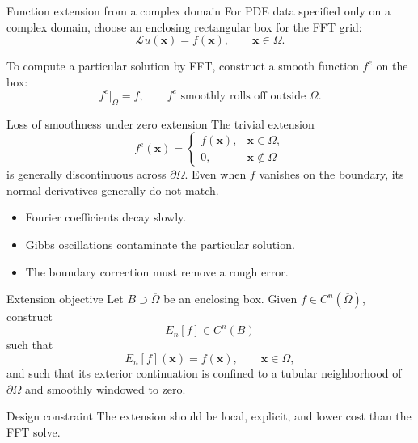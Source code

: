 \documentclass[aspectratio=169,11pt]{beamer}
\newcommand{\x}{\bm{x}}
\begin{document}
\begin{frame}{Function extension from a complex domain}
\small
For PDE data specified only on a complex domain, choose an enclosing
rectangular box for the FFT grid:
\[
  \mathcal{L}u(\x)=f(\x),\qquad \x\in\Omega.
\]

\vspace{2mm}
To compute a particular solution by FFT, construct a smooth function $f^e$ on
the box:
\[
  f^e|_\Omega=f,
  \qquad
  f^e\text{ smoothly rolls off outside }\Omega.
\]
\end{frame}

\begin{frame}{Loss of smoothness under zero extension}
\small
The trivial extension
\[
  f^e(\x)=
  \begin{cases}
  f(\x),& \x\in\Omega,\\
  0,& \x\notin\Omega
  \end{cases}
\]
is generally discontinuous across $\partial\Omega$. Even when $f$ vanishes on
the boundary, its normal derivatives generally do not match.

\begin{itemize}
  \item Fourier coefficients decay slowly.
  \item Gibbs oscillations contaminate the particular solution.
  \item The boundary correction must remove a rough error.
\end{itemize}
\end{frame}

\begin{frame}{Extension objective}
\small
Let $B\supset\overline{\Omega}$ be an enclosing box. Given
$f\in C^n(\overline{\Omega})$, construct
\[
  E_n[f]\in C^n(B)
\]
such that
\[
  E_n[f](\x)=f(\x),\qquad \x\in\Omega,
\]
and such that its exterior continuation is confined to a tubular neighborhood
of $\partial\Omega$ and smoothly windowed to zero.

\begin{block}{Design constraint}
The extension should be local, explicit, and lower cost than the FFT solve.
\end{block}
\end{frame}
\end{document}
